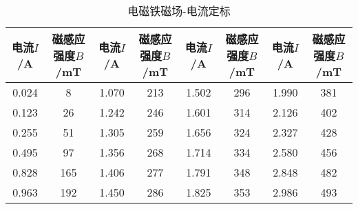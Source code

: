\begin{table}[htbp!]
	\centering\small
	\caption{电磁铁磁场-电流定标}\label{tab:BI}	\begin{tabular}{c||c|c|c|c|c|c|c}
		\hline\hline
		电流$I$/A & {\tiny 磁感应强度}$B$/mT & 电流$I$/A & {\tiny 磁感应强度}$B$/mT & 电流$I$/A & {\tiny 磁感应强度}$B$/mT & 电流$I$/A & {\tiny 磁感应强度}$B$/mT\\		\hline\hline
		0.024 & 8 & 1.070 & 213 & 1.502 & 296 & 1.990 & 381\\		\hline
		0.123 & 26 & 1.242 & 246 & 1.601 & 314 & 2.126 & 402\\		\hline
		0.255 & 51 & 1.305 & 259 & 1.656 & 324 & 2.327 & 428\\		\hline
		0.495 & 97 & 1.356 & 268 & 1.714 & 334 & 2.580 & 456\\		\hline
		0.828 & 165 & 1.406 & 277 & 1.791 & 348 & 2.848 & 482\\		\hline
		0.963 & 192 & 1.450 & 286 & 1.825 & 353 & 2.986 & 493\\		\hline\hline
	\end{tabular}
\end{table}